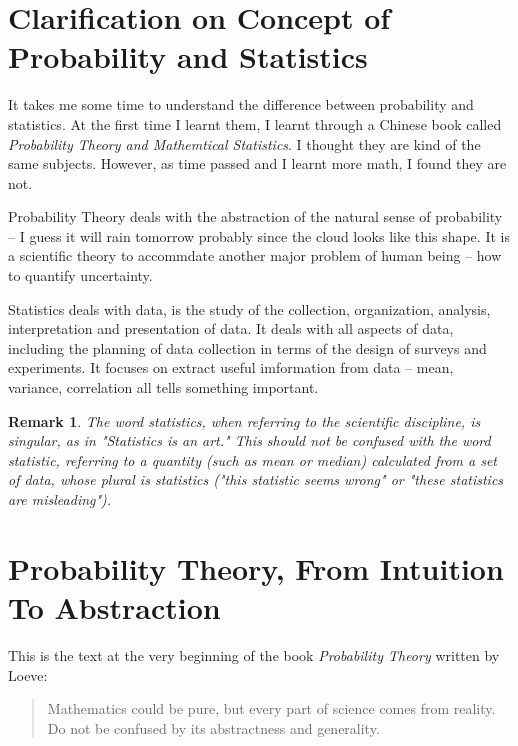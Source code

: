 \documentclass[a4paper]{book}
\newtheorem{remark}{Remark}[section]
\begin{document}
  \section{Clarification on Concept of Probability and Statistics}

  It takes me some time to understand the difference between probability
  and statistics. At the first time I learnt them, I learnt through a
  Chinese book called \textit{Probability Theory and Mathemtical
  Statistics}. I thought they are kind of the same subjects. However, as
  time passed and I learnt more math, I found they are not.

  Probability Theory deals with the abstraction of the natural sense of
  probability -- I guess it will rain tomorrow probably since the cloud
  looks like this shape. It is a scientific theory to accommdate another
  major problem of human being -- how to quantify uncertainty.

  Statistics deals with data, is the study of the collection,
  organization, analysis, interpretation and presentation of data.  It
  deals with all aspects of data, including the planning of data
  collection in terms of the design of surveys and
  experiments.\cite{wiki_statistics} It focuses on extract useful
  imformation from data -- mean, variance, correlation all tells
  something important.

  \begin{remark}
    The word statistics, when referring to the scientific discipline, is
    singular, as in "Statistics is an art." This should not be confused
    with the word statistic, referring to a quantity (such as mean or
    median) calculated from a set of data, whose plural is statistics
    ("this statistic seems wrong" or "these statistics are
    misleading").\cite{wiki_statistics}
  \end{remark}

  \section{Probability Theory, From Intuition To Abstraction}

  This is the text at the very beginning of the book \textit{Probability
  Theory} written by Loeve:

  \begin{quote}
  Mathematics could be pure, but every part of science comes from
  reality.  Do not be confused by its abstractness and generality.
  \end{quote}
\end{document}
